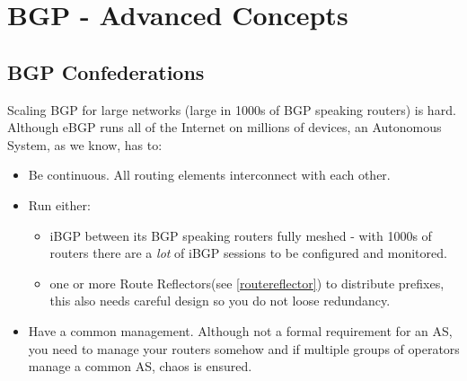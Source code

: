 \chapter{BGP - Advanced Concepts}
\label{ch:advanced}
\section{BGP Confederations}
\label{se:confederations}
Scaling BGP for large networks (large in 1000s of BGP speaking routers) is hard. Although eBGP runs all of the Internet on millions of devices, an Autonomous System, as we know, has to:
\begin{itemize}
  \item Be continuous. All routing elements interconnect with each other.
  \item Run either:
  \begin{itemize}
    \item iBGP between its BGP speaking routers fully meshed - with 1000s of routers there are a \emph{lot} of iBGP sessions to be configured and monitored.
    \item one or more \Glspl{Route Reflector}(see \ref{routereflector}) to distribute prefixes, this also needs careful design so you do not loose redundancy.
  \end{itemize}
  \item Have a common management. Although not a formal requirement for an AS, you need to manage your routers somehow and if multiple groups of operators manage a common AS, chaos is ensured.
\end{itemize}

